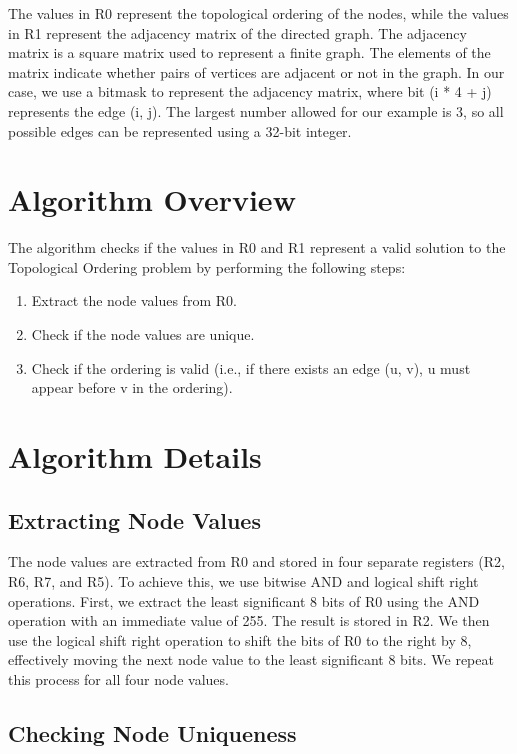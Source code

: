 The values in R0 represent the topological ordering of the nodes, while the values in R1 represent the adjacency matrix of the directed graph. The adjacency matrix is a square matrix used to represent a finite graph. The elements of the matrix indicate whether pairs of vertices are adjacent or not in the graph. In our case, we use a bitmask to represent the adjacency matrix, where bit (i * 4 + j) represents the edge (i, j). The largest number allowed for our example is 3, so all possible edges can be represented using a 32-bit integer.

\section{Algorithm Overview}

The algorithm checks if the values in R0 and R1 represent a valid solution to the Topological Ordering problem by performing the following steps:

\begin{enumerate}
    \item Extract the node values from R0.
    \item Check if the node values are unique.
    \item Check if the ordering is valid (i.e., if there exists an edge (u, v), u must appear before v in the ordering).
\end{enumerate}

\section{Algorithm Details}

\subsection{Extracting Node Values}

The node values are extracted from R0 and stored in four separate registers (R2, R6, R7, and R5). To achieve this, we use bitwise AND and logical shift right operations. First, we extract the least significant 8 bits of R0 using the AND operation with an immediate value of 255. The result is stored in R2. We then use the logical shift right operation to shift the bits of R0 to the right by 8, effectively moving the next node value to the least significant 8 bits. We repeat this process for all four node values.

\subsection{Checking Node Uniqueness}

